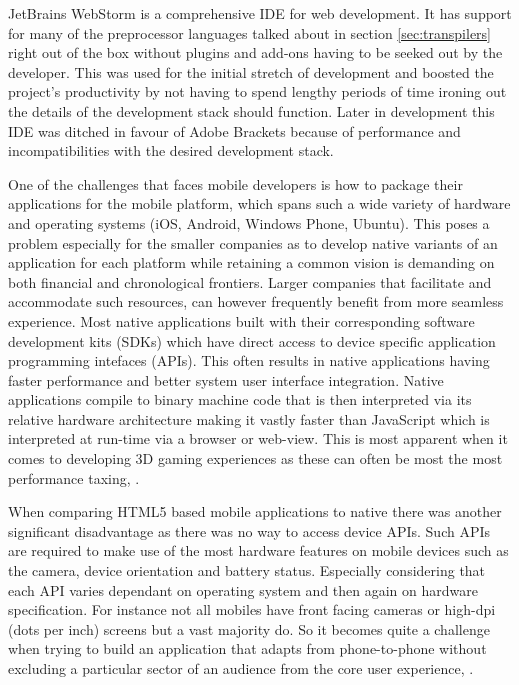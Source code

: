 \documentclass[final]{cmpreport}
\begin{document}

JetBrains WebStorm is a comprehensive IDE for web development. It has support for many of the preprocessor languages talked about in section \ref{sec:transpilers} right out of the box without plugins and add-ons having to be seeked out by the developer. This was used for the initial stretch of development and boosted the project's productivity by not having to spend lengthy periods of time ironing out the details of the development stack should function. Later in development this IDE was ditched in favour of Adobe Brackets because of performance and incompatibilities with the desired development stack.

One of the challenges that faces mobile developers is how to package their applications for the mobile platform, which spans such a wide variety of hardware and operating systems (iOS\footnotemark, Android\footnotemark, Windows Phone\footnotemark, Ubuntu\footnotemark). This poses a problem especially for the smaller companies as to develop native variants of an application for each platform while retaining a common vision is demanding on both financial and chronological frontiers. Larger companies that facilitate and accommodate such resources, can however frequently benefit from more seamless experience. Most native applications built with their corresponding software development kits (SDKs) which have direct access to device specific application programming intefaces (APIs). This often results in native applications having faster performance and better system user interface integration. Native applications compile to binary machine code that is then interpreted via its relative hardware architecture making it vastly faster than JavaScript which is interpreted at run-time via a browser or web-view. This is most apparent when it comes to developing 3D gaming experiences as these can often be most the most performance taxing, \cite{Kulloli}.


When comparing HTML5 based mobile applications to native there was another significant disadvantage as there was no way to access device APIs. Such APIs are required to make use of the most hardware features on mobile devices such as the camera, device orientation and battery status. Especially considering that each API varies dependant on operating system and then again on hardware specification. For instance not all mobiles have front facing cameras or high-dpi (dots per inch) screens but a vast majority do. So it becomes quite a challenge when trying to build an application that adapts from phone-to-phone without excluding a particular sector of an audience from the core user experience, \cite{Charland}.
\end{document}
